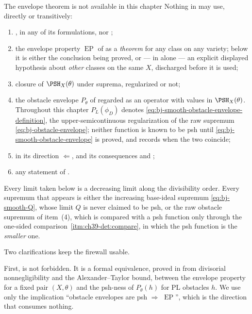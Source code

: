 \begin{warning}{The envelope theorem is not available in this chapter}
\label{warn:ch40-firewall}
Nothing in  may use, directly or
transitively:
\begin{enumerate}
\item {}, in any of its formulations, nor
      ;
\item the envelope property $\operatorname{EP}$ of
       as a \emph{theorem} for any class on
      any variety; below it is either the conclusion being proved, or --- in
       alone --- an explicit displayed
      hypothesis about \emph{other} classes on the same $X$, discharged
      before it is used;
\item closure of $\PSH_X(\theta)$ under suprema, regularized or not;
\item the obstacle envelope $P_\theta$ of
       regarded as an operator with values
      in $\PSH_X(\theta)$.  Throughout this chapter $P_L(\phi_D)$
      denotes \eqref{eq:bj-smooth-obstacle-envelope-definition}, the
      upper-semicontinuous regularization of the raw supremum
      \eqref{eq:bj-obstacle-envelope}; neither function is known to be psh
      until \eqref{eq:bj-smooth-obstacle-envelope} is proved, and
       records when the two coincide;
\item {} in its direction
      $\Leftarrow$, and its consequences
       and
      ;
\item any statement of .
\end{enumerate}
Every limit taken below is a decreasing limit along the divisibility order.
Every supremum that appears is either the increasing base-ideal supremum
\eqref{eq:bj-smooth-Q}, whose limit $Q$ is never claimed to be psh, or the
raw obstacle supremum of item~(4), which is compared with a psh function
only through the one-sided comparison
\,\cref{itm:ch39-det:compare}, in which
the psh function is the \emph{smaller} one.
\end{warning}

Two clarifications keep the firewall usable.

First,  is not forbidden.  It is a
formal equivalence, proved in  from
divisorial nonnegligibility and the Alexander--Taylor bound, between the
envelope property for a fixed pair $(X,\theta)$ and the psh-ness of
$P_\theta(h)$ for PL obstacles $h$.  We use only the implication
``obstacle envelopes are psh $\Rightarrow$ $\operatorname{EP}$'', which
is the direction that consumes nothing.

